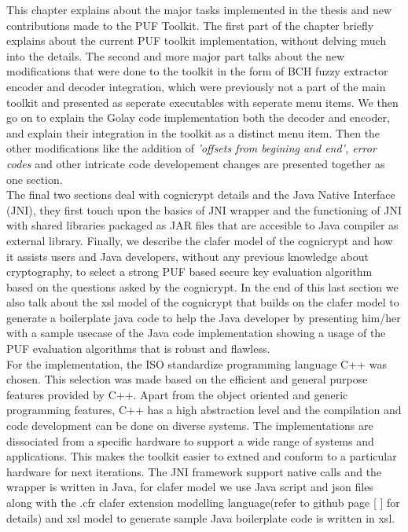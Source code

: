 This chapter explains about the major tasks implemented in the thesis and new contributions made to the PUF Toolkit. The first part of the chapter briefly explains about the current PUF toolkit implementation, without delving much into the details. The second and more major part talks about the new modifications that were done to the toolkit in the form of BCH fuzzy extractor encoder and decoder integration, which were previously not a part of the main toolkit and presented as seperate executables
with seperate menu items. We then go on to explain the Golay code implementation both the decoder and encoder, and explain their integration in the toolkit as a distinct menu item. Then the other modifications like the addition of \emph{'offsets from begining and end', error codes} and other intricate code developement changes are presented together as one section.\\


The final two sections deal with cognicrypt details and the Java Native Interface (JNI), they first touch upon the basics of JNI
wrapper and the functioning of JNI with shared libraries packaged as JAR files that are accesible to Java compiler as external library. Finally, we describe the clafer model of the cognicrypt and how it assists users and Java developers, without any previous knowledge about cryptography, to select a strong PUF based secure key evaluation algorithm based on the questions asked by the cognicrypt. In the end of this last section we also talk about the xsl model of the cognicrypt that builds on
the clafer model to generate a boilerplate java code to help the Java developer by presenting him/her with a sample usecase of the Java code implementation showing a usage of the PUF evaluation algorithms that is robust and flawless.\\

For the implementation, the ISO standardize programming language C++ was chosen. This selection was made based on the efficient and general purpose features provided by C++. Apart from the object oriented and generic programming features, C++ has a high abstraction level and the compilation and code development can be done on diverse systems. The implementations are dissociated from a specific hardware to support a wide range of systems and applications. This makes the toolkit easier
to extned and conform to a particular hardware for next iterations. The JNI framework support native calls and the wrapper is written in Java, for clafer model we use Java script and json files along with the .cfr clafer extension modelling language(refer to github page [ ] for details) and xsl model to generate sample Java boilerplate code is written in xsl.\\

